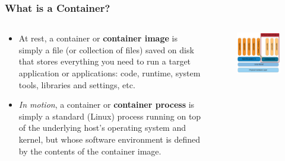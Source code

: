 \documentclass{beamer}
\begin{document}
\begin{frame}
   \frametitle{What is a Container?}
   \begin{columns}
      \begin{column}{0.6\textwidth}
         \begin{itemize}
            \setlength\itemsep{1.0em}
            \item At rest, a container or \textbf{container image} is 
               simply a file (or collection of files) saved on disk that 
               stores everything you need to run a target application or 
               applications: code, runtime, system tools, libraries and 
               settings, etc.
            \item \textit{In motion}, a container or \textbf{container 
               process} is simply a standard (Linux) process running on
               top of the underlying host's operating system and kernel, 
               but whose software environment is defined by the contents 
               of the container image.
         \end{itemize}
      \end{column}
      \hfill
      \begin{column}{0.5\textwidth}
         \begin{figure}[htbp]
            \includegraphics[width=1.0\textwidth]{images/singularity-generic-container-architecture.png}
         \end{figure}
      \end{column}
   \end{columns}
\end{frame}
\end{document}
